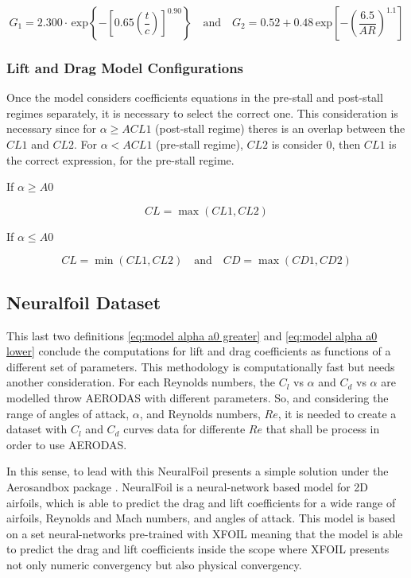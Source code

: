\begin{equation}
    G_1 = 2.300\cdot\,\mathrm{exp}\left\{-\left[0.65\left(\frac{t}{c}\right)\right]^{0.90}\right\} \quad \text{and} \quad G_2 = 0.52 + 0.48\,\mathrm{exp}\left[-\left(\frac{6.5}{A R}\right)^{1.1}\right]
\end{equation}

\subsubsection{Lift and Drag Model Configurations}

Once the model considers coefficients equations in the pre-stall and post-stall regimes separately, it is necessary to select the correct one. This consideration is necessary since for $\alpha \geq ACL1$ (post-stall regime) theres is an overlap between the $CL1$ and $CL2$. For $\alpha < ACL1$ (pre-stall regime), $CL2$ is consider 0, then $CL1$ is the correct expression, for the pre-stall regime.

If $\alpha \geq A0$

\begin{equation}
    C L=\operatorname*{max}(CL1, CL2)
    \label{eq:model alpha a0 greater}    
\end{equation}

If $\alpha \leq A0$

\begin{equation}
    CL = \operatorname*{min}(CL1 , CL2) \quad \text{and} \quad CD = \operatorname*{max}(CD1, CD2)
    \label{eq:model alpha a0 lower}
\end{equation}

\subsection{Neuralfoil Dataset}

This last two definitions \ref{eq:model alpha a0 greater} and \ref{eq:model alpha a0 lower} conclude the computations for lift and drag coefficients as functions of a different set of parameters. This methodology is computationally fast but needs another consideration. For each Reynolds numbers, the $C_l$ vs $\alpha$ and $C_d$ vs $\alpha$ are modelled throw AERODAS with different parameters. So, and considering the range of angles of attack, $\alpha$, and Reynolds numbers, $Re$, it is needed to create a dataset with $C_l$ and $C_d$ curves data for differente $Re$ that shall be process in order to use AERODAS.

In this sense, to lead with this NeuralFoil \cite{sharpe_neuralfoil_nodate} presents a simple solution under the Aerosandbox package \cite{sharpe_aerosandbox_nodate,sharpe_accelerating_nodate}. NeuralFoil is a neural-network based model for 2D airfoils, which is able to predict the drag and lift coefficients for a wide range of airfoils, Reynolds and Mach numbers, and angles of attack. This model is based on a set neural-networks pre-trained with XFOIL meaning that the model is able to predict the drag and lift coefficients inside the scope where XFOIL presents not only numeric convergency but also physical convergency. 

